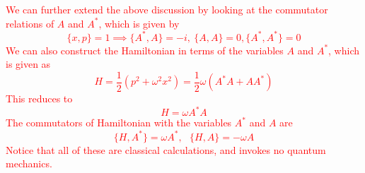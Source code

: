 \documentclass[11pt]{article}
\newcommand{\w}{\omega}
\numberwithin{equation}{section}
\begin{document}
        \textcolor{red}{
            We can further extend the above discussion by looking at the commutator relations of \(A\) and \(A^*\), which is given by 
            \begin{equation*}
                \{x,p\} = 1 \implies \{A^*, A\} = -i, ~\{A, A\}=0,\{A^*, A^*\} = 0 
            \end{equation*}
            We can also construct the Hamiltonian in terms of the variables \(A\) and \(A^*\), which is given as 
        \begin{equation*}
            H = \frac{1}{2}(p^2 + \w^2x^2) = \frac{1}{2}\w(A^*A+ AA^*) \tag{\(\star\)}
            \label{eq:ham_in_class}
        \end{equation*}
        This reduces to 
        \begin{equation*}
            H = \w A^* A
        \end{equation*}
        The commutators of Hamiltonian with the variables \(A^*\) and \(A\) are 
        \begin{equation*}
            \{H, A^*\} = \w A^*,~~~\{H, A\} = -\w A 
        \end{equation*}
        Notice that all of these are classical calculations, and invokes no quantum mechanics. 
        }
    
    \newpage
\end{document}

